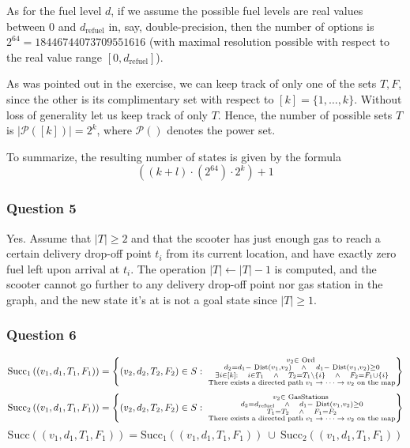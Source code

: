 \documentclass[11pt]{article}
\begin{document}
As for the fuel level \(d\), if we assume the possible fuel levels are
real values between \(0\) and \(d_\textrm{refuel}\) in, say,
double-precision, then the number of options is
\(2^{64}=18446744073709551616\) (with maximal resolution possible with
respect to the real value range \([0,d_\textrm{refuel}]\)).

As was pointed out in the exercise, we can keep track of only one of the
sets \(T,F\), since the other is its complimentary set with respect to
\([k] =\{ 1,\dots,k\}\). Without loss of generality let us keep track of
only \(T\). Hence, the number of possible sets \(T\) is
\(|\mathcal{P}([k])|=2^k\), where \(\mathcal{P}()\) denotes the power
set.

To summarize, the resulting number of states is given by the formula
\[((k+l)\cdot (2^{64})\cdot 2^{k})+1\]

    \subsubsection{Question 5}\label{question-5}

Yes. Assume that \(|T|\geq 2\) and that the scooter has just enough gas
to reach a certain delivery drop-off point \(t_i\) from its current
location, and have exactly zero fuel left upon arrival at \(t_i\). The
operation \(|T|\leftarrow |T|-1\) is computed, and the scooter cannot go
further to any delivery drop-off point nor gas station in the graph, and
the new state it's at is not a goal state since \(|T|\geq 1\).

    \subsubsection{Question 6}\label{question-6}

\[\text{Succ}_{1}\left(\left(v_{1},d_{1},T_{1},F_{1}\right)\right) = \left\{ \left(v_{2},d_{2},T_{2},F_{2}\right)\in S:\ \substack{v_{2}\in\text{ Ord }\\
d_{2}=d_{1}-\text{ Dist}\left(v_{1},v_{2}\right)\quad\land\quad d_{1}-\text{ Dist}\left(v_{1},v_{2}\right)\geq0\\
\exists i\in\left[k\right]:\quad i\in T_{1}\quad\land\quad T_{2}=T_{1}\setminus\left\{ i\right\} \quad\land\quad F_{2}=F_{1}\cup\left\{ i\right\} \\
\text{There exists a directed path \ensuremath{v_{1}\to\dots\to v_{2}} on the map}
}
\right\}\] \[
\text{Succ}_{2}\left(\left(v_{1},d_{1},T_{1},F_{1}\right)\right)    =\left\{ \left(v_{2},d_{2},T_{2},F_{2}\right)\in S:\ \substack{v_{2}\in\text{ GasStations }\\
d_{2}=d_{\text{refuel}}\quad\land\quad d_{1}-\text{ Dist}\left(v_{1},v_{2}\right)\geq0\\
T_{1}=T_{2}\quad\land\quad F_{1}=F_{2}\\
\text{There exists a directed path \ensuremath{v_{1}\to\dots\to v_{2}} on the map}
}
\right\} \] \[
\text{Succ}{\left(\left(v_{1},d_{1},T_{1},F_{1}\right)\right)}  =\text{Succ}_{1}\left(\left(v_{1},d_{1},T_{1},F_{1}\right)\right)\ \cup\ \text{Succ}_{2}\left(\left(v_{1},d_{1},T_{1},F_{1}\right)\right)\]
\end{document}
